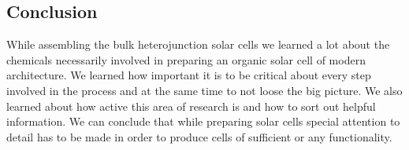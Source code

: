 \documentclass[a4paper,10pt,twocolumn]{article}
\begin{document}
\begin{extract*}

\section{Conclusion}\label{sec:conclusion}

While assembling the bulk heterojunction solar cells we learned a lot about the chemicals necessarily involved in preparing an organic solar cell of modern architecture. We learned how important it is to be critical about every step involved in the process and at the same time to not loose the big picture. We also learned about how active this area of research is and how to sort out helpful information. \mypar
We can conclude that while preparing solar cells special attention to detail has to be made in order to produce cells of sufficient or any functionality.



\end{extract*}
\end{document}
